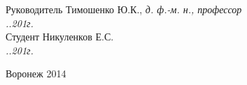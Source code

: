 \begin{titlepage}
\begin{flushleft}
Руководитель \underline{\hspace{30mm}} Тимошенко Ю.К., {\it д. ф.-м. н., профессор}\\
{\it\underline{\hspace{10mm}}.\underline{\hspace{10mm}}.201\underline{\hspace{5mm}}г.}\\
Студент \hspace{13mm}\underline{\hspace{30mm}} Никуленков Е.С. \\
{\it\underline{\hspace{10mm}}.\underline{\hspace{10mm}}.201\underline{\hspace{5mm}}г.}\\
\end{flushleft}
\vspace{10mm}
\begin{center}
Воронеж 2014
\end{center}
\end{titlepage}

\newpage
\setcounter{page}{2}
